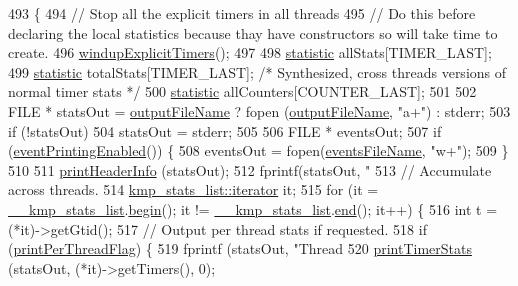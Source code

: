 \begin{DoxyCode}
493 \{
494     \textcolor{comment}{// Stop all the explicit timers in all threads}
495     \textcolor{comment}{// Do this before declaring the local statistics because thay have constructors so will take time to
       create.}
496     \hyperlink{classkmp__stats__output__module_a899a6909e92d51c4499e9ae122e2c1dd}{windupExplicitTimers}();
497 
498     \hyperlink{classstatistic}{statistic} allStats[TIMER\_LAST];
499     \hyperlink{classstatistic}{statistic} totalStats[TIMER\_LAST];           \textcolor{comment}{/* Synthesized, cross threads versions of normal
       timer stats */}
500     \hyperlink{classstatistic}{statistic} allCounters[COUNTER\_LAST];
501 
502     FILE * statsOut = \hyperlink{classkmp__stats__output__module_a6df3664723fafa911c12fb75870a98ae}{outputFileName} ? fopen (\hyperlink{classkmp__stats__output__module_a6df3664723fafa911c12fb75870a98ae}{outputFileName}, \textcolor{stringliteral}{"a+"}) : stderr;
503     \textcolor{keywordflow}{if} (!statsOut)
504         statsOut = stderr;
505 
506     FILE * eventsOut;
507     \textcolor{keywordflow}{if} (\hyperlink{classkmp__stats__output__module_a9aeeac53a52599c4f50c7be846ef6e7c}{eventPrintingEnabled}()) \{
508         eventsOut = fopen(\hyperlink{classkmp__stats__output__module_abeb05f889265a698f6d82f1a66f0ea6d}{eventsFileName}, \textcolor{stringliteral}{"w+"});
509     \}
510 
511     \hyperlink{classkmp__stats__output__module_abc56f7bd50f29fdc7b9980d31c95433a}{printHeaderInfo} (statsOut);
512     fprintf(statsOut, \textcolor{stringliteral}{"%
513     \textcolor{comment}{// Accumulate across threads.}
514     \hyperlink{classkmp__stats__list_1_1iterator}{kmp\_stats\_list::iterator} it;
515     \textcolor{keywordflow}{for} (it = \hyperlink{kmp__global_8c_a4ce412fd3335747984f4b5d8fa62cb98}{\_\_kmp\_stats\_list}.\hyperlink{classkmp__stats__list_af688afb91e7dab63d4b1005d8c2d858e}{begin}(); it != 
      \hyperlink{kmp__global_8c_a4ce412fd3335747984f4b5d8fa62cb98}{\_\_kmp\_stats\_list}.\hyperlink{classkmp__stats__list_ad0ae8a080fec141c81d3e3454d25c99b}{end}(); it++) \{
516         \textcolor{keywordtype}{int} t = (*it)->getGtid();
517         \textcolor{comment}{// Output per thread stats if requested.}
518         \textcolor{keywordflow}{if} (\hyperlink{classkmp__stats__output__module_adfe5f484599e868c3695086fa3618640}{printPerThreadFlag}) \{
519             fprintf (statsOut, \textcolor{stringliteral}{"Thread %
520             \hyperlink{classkmp__stats__output__module_afbfb63055322654b4d730d8d55283918}{printTimerStats} (statsOut, (*it)->getTimers(), 0);
}}
\end{DoxyCode}
